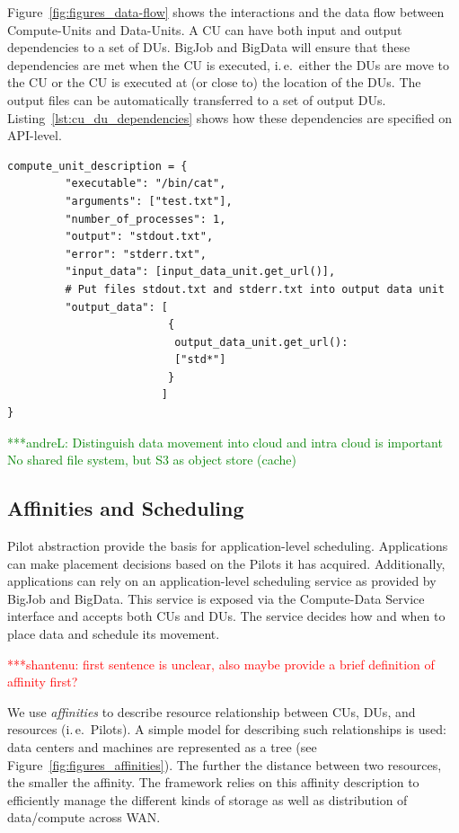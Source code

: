 \documentclass[times]{cpeauth}
\newcommand{\jhanote}[1]{ {\textcolor{red} { ***shantenu: #1 }}}
\newcommand{\alnote}[1]{ {\textcolor{green} { ***andreL: #1 }}}
\newcommand{\alnote}[1]{}
\newcommand{\jhanote}[1]{}
\newcommand{\pilot}{Pilot\xspace}
\newcommand{\pilots}{Pilots\xspace}
\newcommand{\computedataservice}{Compute-Data Service\xspace}
\newcommand{\computeunit}{Compute-Unit\xspace}
\newcommand{\computeunits}{Compute-Units\xspace}
\newcommand{\dataunit}{Data-Unit\xspace}
\newcommand{\dataunits}{Data-Units\xspace}
\newcommand{\dus}{DUs\xspace}
\newcommand{\cu}{CU\xspace}
\newcommand{\cus}{CUs\xspace}
\begin{document}
Figure~\ref{fig:figures_data-flow} shows the interactions and the data
flow between \computeunits and \dataunits. A \cu can have both input
and output dependencies to a set of \dus. BigJob and BigData will
ensure that these dependencies are met when the \cu is executed,
i.\,e.\ either the \dus are move to the \cu or the \cu is executed at
(or close to) the location of the \dus. The output files can be
automatically transferred to a set of output
\dus. Listing~\ref{lst:cu_du_dependencies} shows how these
dependencies are specified on API-level.

\begin{lstlisting}[caption={{Managing \dataunit/\computeunit Dependencies}}, style=myPythonListing, label={lst:cu_du_dependencies}, float=t]
compute_unit_description = {
         "executable": "/bin/cat",
         "arguments": ["test.txt"],
         "number_of_processes": 1,
         "output": "stdout.txt",
         "error": "stderr.txt",   
         "input_data": [input_data_unit.get_url()],
         # Put files stdout.txt and stderr.txt into output data unit
         "output_data": [
                         {
                          output_data_unit.get_url(): 
                          ["std*"]
                         }
                        ]    
}
\end{lstlisting}


\alnote{
Distinguish data movement into cloud and intra cloud is important
No shared file system, but S3 as object store (cache)
}


\subsection{Affinities and Scheduling}

\pilot abstraction provide the basis for application-level scheduling.
Applications can make placement decisions based on the \pilots it has
acquired. Additionally, applications can rely on an application-level
scheduling service as provided by BigJob and BigData. This service is exposed
via the \computedataservice interface and accepts both \cus and \dus. The
service decides how and when to place data and schedule its movement. 

\jhanote{first sentence is unclear, also maybe provide a brief
  definition of affinity first?} 

We use {\it affinities} to describe resource relationship between \cus, \dus,
and resources (i.\,e.\ \pilots). A simple model for describing such
relationships is used: data centers and machines are represented as a tree
(see Figure~\ref{fig:figures_affinities}). The further the distance between
two resources, the smaller the affinity. The framework relies on this affinity
description to efficiently manage the different kinds of storage as well as
distribution of data/compute across WAN.
\end{document}
